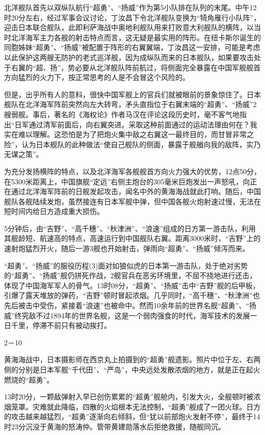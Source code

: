 \documentclass[12pt,UTF8]{ctexbook}
\begin{document}
北洋舰队首先以双纵队航行“超勇”、“扬威”作为第5小队排在队列的末尾。中午12时20分左右，经过军事会议讨论，丁汝昌下令北洋舰队变换为“犄角雁行小队阵”，迎击日本联合舰队，此即利萨海战中奥地利舰队用来打败意大利舰队的横阵，以当时北洋海军主力各舰的射击特点而言，这无疑是最实用的阵形。在纽卡斯尔诞生的同胞姊妹“超勇”、“扬威”被配置于阵形的右翼翼端，丁汝昌这一安排，可能是考虑以此保护这两艘无防护的老式巡洋舰，因为成纵队而来的日本舰队，如果要攻击处于右翼的“超、扬”，势必要从北洋舰队阵前航过，将侧面完全暴露在中国军舰舰首方向猛烈的火力下，按正常思考的人是不会冒这个风险的。

但是，出乎所有人的意料，很快中国军舰上的官兵们就被眼前的景象惊住了。日本舰队在北洋海军阵前突然向左大转弯，矛头直指位于右翼末端的“超勇”、“扬威”2艘弱舰。事后，著名的《海权论》作者马汉在评论这段历史时，毫不客气地指出“日军通过清军前面后，向右翼突进。采取这种前面通过的运动法理由何在？我实在难以理解。这恐怕是为了把炮火集中敌之右翼这一最终目的，而甘冒非常之险”，认为日本舰队的此种做法“使自己舰队的侧面，暴露于舰艏向我的敌阵，实乃无谋之策”。

为充分发扬横阵的特点，以及北洋海军各舰舰首方向火力强大的优势，12点50分，在5300米距离上，中国旗舰“定远”右侧主炮台的305毫米巨炮发出一声怒吼，向正在通过北洋海军阵前的日舰发起攻击，闻名中外的黄海海战就此打响。随后，中国舰队各舰陆续发炮，虽然接连有日本军舰中弹，但中国各舰火炮射速过慢，无法在短时间内给日方造成重大损伤。

5分钟后，由“吉野”、“高千穗”、“秋津洲”、“浪速”组成的日方第一游击队，利用其舰龄短、航速高的特点，高速运行到中国舰队右翼。距离3000米时，“吉野”上的速射炮猛烈开火，随后一游3舰也开始射击，弹雨向“超勇”、“扬威”倾泻而来。

“超勇”、“扬威”的服役历程(3)面对如狼似虎的日本第一游击队，处于绝对劣势的“超勇”、“扬威”舰仍拼死作战，2舰官兵在恶劣环境里，不屈不挠地进行还击，体现了中国海军军人的骨气。13时08分，“超勇”、“扬威”击中“吉野”舰的后甲板，引爆了露天堆放的弹药，“吉野”顿时冒起浓烟。几乎同时，“高千穗”、“秋津洲”也先后被击中受伤，紧接着“浪速”也被命中。然而10余年前的世界名舰“超勇”、“扬威”终究敌不过1894年的世界名舰，这是一个弱肉强食的时代，海军技术的发展一日千里，停滞不前只有被动挨打。

2－10

黄海海战中，日本摄影师在西京丸上拍摄到的“超勇”舰遗影。照片中位于左、右两侧的分别是日本军舰“千代田”、“严岛”，中央远处发散浓烟的地方，就是正在起火燃烧的“超勇”。

13时20分，一颗敌弹射入早已创伤累累的“超勇”舰舱内，引发大火，全舰顿时被浓烟笼罩。灾难就此降临，四散的火焰根本无法控制，“超勇”舰成了一团火球。日方的攻击越来越猛烈，“超勇”逐渐向右倾斜，但“犹以前部炮火发射不停”，最终于14时23分沉没于黄海的怒涛仲。管带黄建勋落水后拒绝救援，随舰同沉。
\end{document}

